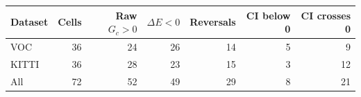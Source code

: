 \begin{tabular}{lrrrrrr}
\toprule
Dataset & Cells & Raw $G_c>0$ & $\Delta E<0$ & Reversals & CI below 0 & CI crosses 0\\
\midrule
VOC & 36 & 24 & 26 & 14 & 5 & 9\\
KITTI & 36 & 28 & 23 & 15 & 3 & 12\\
All & 72 & 52 & 49 & 29 & 8 & 21\\
\bottomrule
\end{tabular}
